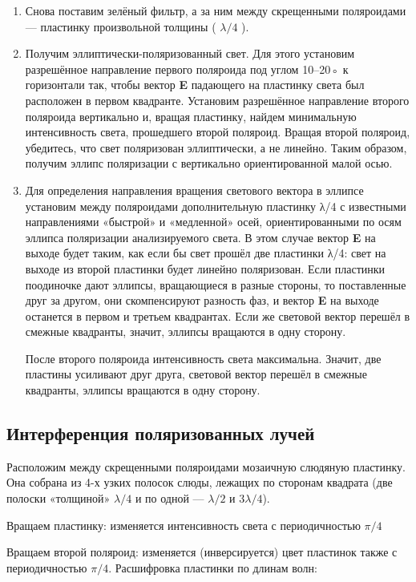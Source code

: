 \documentclass[a4paper]{article}
\begin{document}
\begin{enumerate}
    \item  Снова поставим зелёный фильтр,
а за ним между скрещенными поляроидами
— пластинку произвольной толщины (
$\lambda/4$ ).
\item Получим эллиптически-поляризованный свет. Для этого установим разрешённое направление первого поляроида под углом 10–20◦ к горизонтали так, чтобы вектор \textbf{E} падающего на пластинку света был расположен в первом квадранте.
Установим разрешённое направление второго поляроида вертикально и, вращая пластинку, найдем минимальную
интенсивность света, прошедшего второй поляроид. Вращая второй поляроид, убедитесь, что свет поляризован эллиптически,
а не линейно.
Таким образом, получим эллипс поляризации с вертикально ориентированной малой осью.
\item  Для определения направления вращения светового вектора в эллипсе
установим между поляроидами дополнительную пластинку λ/4 с известными направлениями «быстрой» и «медленной» осей, ориентированными по осям эллипса поляризации анализируемого света.
В этом случае вектор \textbf{E} на выходе будет таким, как если бы свет прошёл две
пластинки λ/4: свет на выходе из второй пластинки будет линейно поляризован. Если пластинки поодиночке дают эллипсы, вращающиеся в разные стороны, то поставленные друг за другом, они скомпенсируют
разность фаз, и вектор \textbf{E} на выходе останется в первом
и третьем квадрантах. Если
же световой вектор перешёл в смежные квадранты, значит, эллипсы вращаются в одну сторону. 
\par После второго поляроида интенсивность света максимальна. Значит, две пластины усиливают друг друга, световой вектор перешёл в смежные квадранты, эллипсы вращаются в одну сторону.

\end{enumerate}

\subsection{Интерференция поляризованных лучей}

Расположим между скрещенными поляроидами мозаичную слюдяную пластинку. Она собрана из 4-х узких полосок слюды, лежащих по сторонам квадрата (две полоски «толщиной» $\lambda/4$ и по одной — $\lambda/2$ и $3\lambda/4$).
\par Вращаем пластинку: изменяется интенсивность света с периодичностью $\pi/4$
\par Вращаем второй поляроид: изменяется (инверсируется) цвет пластинок также с периодичностью  $\pi/4$. Расшифровка пластинки по длинам волн:
\end{document}

